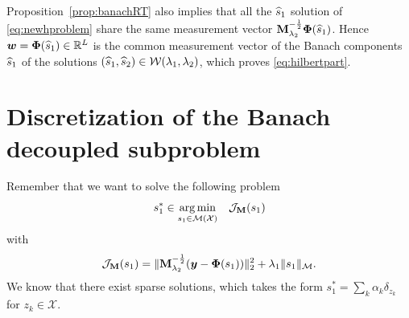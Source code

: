     Proposition~\ref{prop:banachRT} also implies that all the $\widehat{s}_1$ solution of \eqref{eq:newhproblem} share the same measurement vector $\mathbf{M}_{\lambda_{2}}^{-\frac{1}{2}} \bm{\Phi} (\widehat{s}_1)$. Hence $\bm{w} = \bm{\Phi}(\widehat{s}_1) \in \mathbb{R}^L$ is the common measurement vector of the Banach components $\widehat{s}_1$ of the solutions $(\widehat{s}_1 , \widehat{s}_2) \in \mathcal{W} (\lambda_{1},\lambda_{2})$, which proves \eqref{eq:hilbertpart}.

    

\clearpage
\section{Discretization of the Banach decoupled subproblem}
    \label{app:discretization}
        Remember that we want to solve the following problem
        $$s_1^* \in \underset{ s_1\in{\mathcal{M}}({\mathcal{X}})}{\arg\min} \quad \mathcal{J}_{\mathbf{M}}(s_1)$$
        with
        $$\mathcal{J}_{\mathbf{M}}(s_1)= \|\mathbf{M}_{\lambda_{2}}^{-\frac{1}{2}} ( \bm{y} - \bm{\Phi}(s_1)  ) \|_2^2  + \lambda_{1} \| s_1 \|_{\mathcal{M}}.$$
        We know that there exist sparse solutions, which takes the form $s_1^* = \sum_k \alpha_k \delta_{z_k}$ for $z_k\in\mathcal{X}$.

